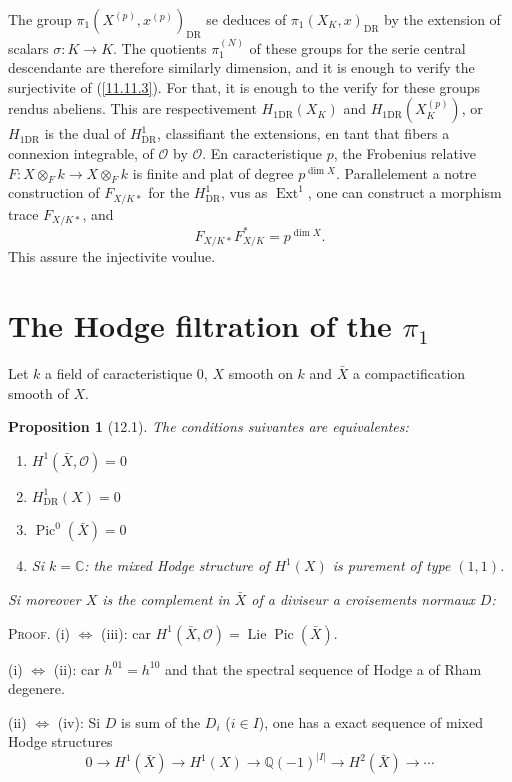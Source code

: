 \documentclass[12pt,a4paper]{article}
\theoremstyle{plain}
\newtheorem{proposition}[theorem]{Proposition}
\theoremstyle{definition}
\theoremstyle{remark}
\DeclareMathOperator{\Lie}{Lie}
\DeclareMathOperator{\Ext}{Ext}
\DeclareMathOperator{\Pic}{Pic}
\newcommand{\Q}{\mathbb{Q}}
\newcommand{\C}{\mathbb{C}}
\newcommand{\DR}{\mathrm{DR}}
\begin{document}
The group $\pi_1(X^{(p)}, x^{(p)})_{\DR}$ se deduces of $\pi_1(X_K, x)_{\DR}$ by the extension of scalars $\sigma: K \to K$. The quotients $\pi_1^{(N)}$ of these groups for the serie central descendante are therefore similarly dimension, and it is enough to verify the surjectivite of (\ref{11.11.3}). For that, it is enough to the verify for these groups rendus abeliens. This are respectivement $H_{1\DR}(X_K)$ and $H_{1\DR}(X_K^{(p)})$, or $H_{1\DR}$ is the dual of $H^1_{\DR}$, classifiant the extensions, en tant that fibers a connexion integrable, of $\mathcal{O}$ by $\mathcal{O}$. En caracteristique $p$, the Frobenius relative $F: X \otimes_F k \to X \otimes_{F} k$ is finite and plat of degree $p^{\dim X}$. Parallelement a notre construction of $F_{X/K *}$ for the $H^1_{\DR}$, vus as $\Ext^1$, one can construct a morphism trace $F_{X/K *}$, and
$$F_{X/K *} F_{X/K}^* = p^{\dim X}.$$
This assure the injectivite voulue.


\section{The Hodge filtration of the $\pi_1$}

Let $k$ a field of caracteristique 0, $X$ smooth on $k$ and $\bar{X}$ a compactification smooth of $X$.

\begin{proposition}[12.1]
The conditions suivantes are equivalentes:
\begin{enumerate}[label=(\roman*)]
\item $H^1(\bar{X}, \mathcal{O}) = 0$
\item $H^1_{\DR}(X) = 0$
\item $\Pic^0(\bar{X}) = 0$
\item Si $k = \C$: the mixed Hodge structure of $H^1(X)$ is purement of type $(1,1)$.
\end{enumerate}
Si moreover $X$ is the complement in $\bar{X}$ of a diviseur a croisements normaux $D$:
\end{proposition}

\textsc{Proof.} (i) $\Leftrightarrow$ (iii): car $H^1(\bar{X}, \mathcal{O}) = \Lie \Pic(\bar{X})$.

(i) $\Leftrightarrow$ (ii): car $h^{01} = h^{10}$ and that the spectral sequence of Hodge a of Rham degenere.

(ii) $\Leftrightarrow$ (iv): Si $D$ is sum of the $D_i$ ($i \in I$), one has a exact sequence of mixed Hodge structures
$$0 \longrightarrow H^1(\bar{X}) \longrightarrow H^1(X) \longrightarrow \Q(-1)^{|I|} \longrightarrow H^2(\bar{X}) \longrightarrow \cdots$$
\end{document}
